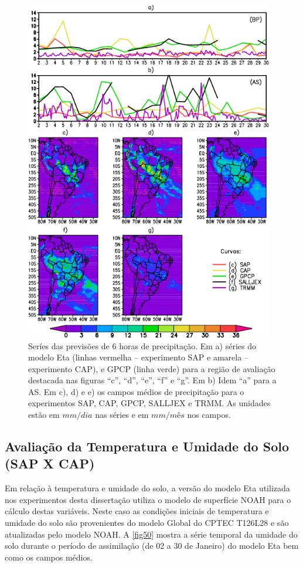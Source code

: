 \begin{figure}[!hbp]
\centering
\includegraphics[height=15cm]{./figs/serie_precipitacao-FCT06h-new.png}
\caption{Seríes das previsões de 6 horas de precipitação. Em a) séries do modelo Eta (linhas vermelha – experimento SAP e amarela – experimento CAP), e GPCP (linha verde) para a região de avaliação destacada nas figuras ``c'', ``d'', ``e'', ``f'' e ``g''. Em b) Idem ``a'' para a AS. Em c), d) e e) os campos médios de precipitação para o experimentos SAP, CAP, GPCP, SALLJEX e TRMM. As unidades estão em $mm/dia$ nas séries e em $mm/m$\^{e}$s$ nos campos.}
\label{fig52}
\end{figure}

\break

\subsection{Avaliação da Temperatura e Umidade do Solo (SAP X CAP)}
\label{ss:avaltempumi}

Em relação à temperatura e umidade do solo, a versão do modelo Eta utilizada nos experimentos desta dissertação utiliza o modelo de superfície NOAH para o cálculo destas variáveis. Neste caso as condições iniciais de temperatura e umidade do solo são provenientes do modelo Global do CPTEC T126L28 e são atualizadas pelo modelo NOAH. A \autoref{fig50} mostra a série temporal da umidade do solo durante o período de assimilação (de 02 a 30 de Janeiro) do modelo Eta bem como os campos médios.

